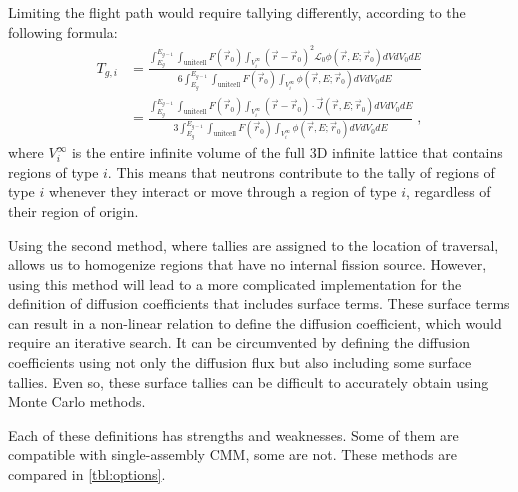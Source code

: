 \documentclass[a4paper,letterpaper,12pt,oneside,draft]{article}
\newcommand{\eec}{\;,}
\newcommand{\OpL}{\mathscr{L}}
\newcommand{\intg}[2][g]{\ensuremath{\int_{E_{#1}}^{E_{#1-1}} #2 dE}}
\newcommand{\vr}{\ensuremath{\vec{r}}}
\newcommand{\dvr}{\left(\vr-\vr_0\right)}
\begin{document}
Limiting the flight path would require tallying differently, according to the following formula:
\begin{align}
    \nonumber
    T_{g,i} &= \frac{\intg{\int_{\text{unitcell}}F(\vr_0)\int_{V_i^\infty} \dvr^2\OpL_0\phi(\vr,E;\vr_0)dVdV_0}} {6\intg{\int_{\text{unitcell}}F(\vr_0)\int_{V_i^\infty}\phi(\vr,E;\vr_0)dVdV_0}} \\
    \label{eq:Tally:limitflight}
    &= \frac{\intg{\int_{\text{unitcell}}F(\vr_0)\int_{V_i^\infty} \dvr\cdot\vec{J}(\vr,E;\vr_0)dVdV_0}} {3\intg{\int_{\text{unitcell}}F(\vr_0)\int_{V_i^\infty}\phi(\vr,E;\vr_0)dVdV_0}}\eec
\end{align}
where $V_i^\infty$ is the entire infinite volume of the full 3D infinite lattice that contains regions of type $i$.
This means that neutrons contribute to the tally of regions of type $i$ whenever they interact or move through a region of type $i$, regardless of their region of origin.

Using the second method, where tallies are assigned to the location of traversal, allows us to homogenize regions that have no internal fission source.
However, using this method will lead to a more complicated implementation for the definition of diffusion coefficients that includes surface terms.
These surface terms can result in a non-linear relation to define the diffusion coefficient, which would require an iterative search.
It can be circumvented by defining the diffusion coefficients using not only the diffusion flux but also including some surface tallies.
Even so, these surface tallies can be difficult to accurately obtain using Monte Carlo methods.

Each of these definitions has strengths and weaknesses. 
Some of them are compatible with single-assembly CMM, some are not.
These methods are compared in \cref{tbl:options}.
\end{document}

